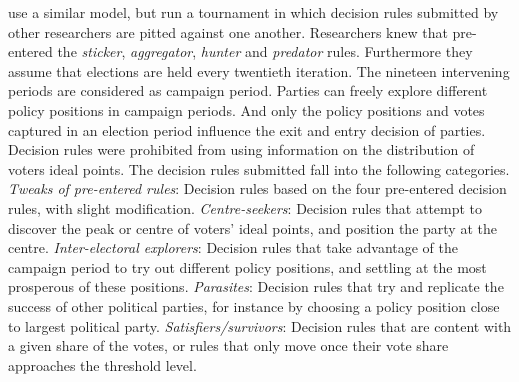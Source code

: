 \documentclass[preprint, 12pt]{elsarticle}
\begin{document}
\citet{Fowler_Laver_2008} use a similar model, but run a tournament in which decision rules submitted by other researchers are pitted against one another. Researchers knew that \citet{Fowler_Laver_2008} pre-entered the \emph{sticker}, \emph{aggregator}, \emph{hunter} and \emph{predator} rules. Furthermore they assume that elections are held every twentieth iteration. The nineteen intervening periods are considered as campaign period. Parties can freely explore different policy positions in campaign periods. And only the policy positions and votes captured in an election period influence the exit and entry decision of parties. Decision rules were prohibited from using information on the distribution of voters ideal points. The decision rules submitted fall into the following categories. \emph{Tweaks of pre-entered rules}: Decision rules based on the four pre-entered decision rules, with slight modification. \emph{Centre-seekers}: Decision rules that attempt to discover the peak or centre of voters' ideal points, and position the party at the centre. \emph{Inter-electoral explorers}: Decision rules that take advantage of the campaign period to try out different policy positions, and settling at the most prosperous of these positions. \emph{Parasites}: Decision rules that try and replicate the success of other political parties, for instance by choosing a policy position close to largest political party. \emph{Satisfiers/survivors}: Decision rules that are content with a given share of the votes, or rules that only move once their vote share approaches the threshold level.
\end{document}
